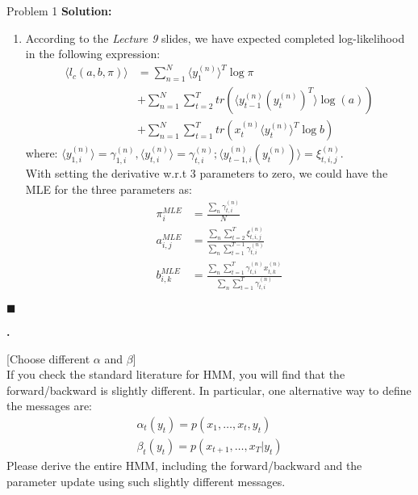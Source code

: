\documentclass{article}
\newcounter{pcounter}                                   %
\newenvironment{problem}                                %
{                                                       %
    \color{gray}                                        %
    \stepcounter{pcounter}                              %
    \textbf{\arabic{pcounter}.}                         %
}{}                                                     %
\newenvironment{solution}                               %
{\textbf{Solution:} }{$\blacksquare$}                   %
\begin{document}
\begin{section}{Problem 1}
\begin{solution}
\begin{enumerate}[label=\alph*)]
                \item %
                According to the \textit{Lecture 9} slides, we have expected completed log-likelihood in the following expression:
                \begin{align*}
                    \langle{l_c(a,b,\pi)}\rangle &=
                    \sum_{n=1}^N \langle{y_1^{(n)}}\rangle^T \log{\pi} \\
                    & + \sum_{n=1}^{N}\sum_{t=2}^{T} tr(\langle{ y_{t-1}^{(n)}( y_t^{(n)} )^T}\rangle \log(a)) \\
                    & + \sum_{n=1}^{N}\sum_{t=1}^{T} tr( x^{(n)}_t \langle{y^{(n)}_t}\rangle^T \log{b})
                \end{align*}
                where: $\langle{y^{(n)}_{1,i}}\rangle = \gamma^{(n)}_{1,i}, 
                \langle{y^{(n)}_{t,i}}\rangle = \gamma^{(n)}_{t,i};
                \langle{y^{(n)}_{t-1,i}(y^{(n)}_t)}\rangle = \xi^{(n)}_{t,i,j}$.\\
                With setting the derivative w.r.t 3 parameters to zero, we could have the MLE for the three parameters as:
                \begin{align*}
                    \pi_{i}^{MLE} &= \frac{\sum_n \gamma^{(n)}_{t,i}}{N}\\
                    a_{i,j}^{MLE} &= \frac{\sum_n\sum_{t=2}^T \xi^{(n)}_{t,i,j}}{\sum_n\sum_{t=1}^{T-1} \gamma^{(n)}_{t,i}}\\
                    b_{i,k}^{MLE} &=
                                \frac{\sum_n\sum_{t=1}^T \gamma^{(n)}_{t,i} x^{(n)}_{t,k}}
                                {\sum_n\sum_{t=1}^T \gamma^{(n)}_{t,i}}
                \end{align*}

            \end{enumerate}
        \end{solution}
        
        \begin{problem}
            [Choose different $\alpha$ and $\beta$]\\
            If you check the standard literature for HMM, you will find that the forward/backward is slightly different. In particular, one alternative way to define the messages are:
            \begin{gather*}
                \alpha_t(y_t) = p(x_1, \dots, x_t, y_t)
                \\
                \beta_t(y_t)  = p(x_{t+1}, \dots, x_T|y_t)
            \end{gather*}
            Please derive the entire HMM, including the forward/backward and the parameter update using such slightly different messages.
        \end{problem}


\end{section}
\end{document}

